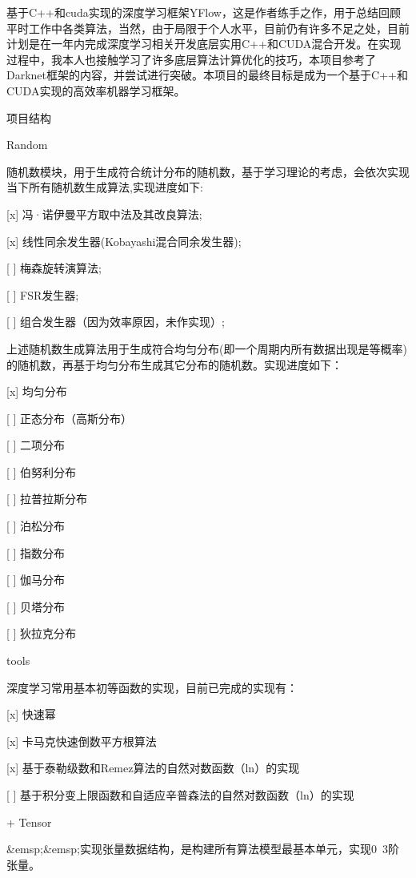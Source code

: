 \quad{}\quad{}基于\+C++和cuda实现的深度学习框架\+YFlow，这是作者练手之作，用于总结回顾平时工作中各类算法，当然，由于局限于个人水平，目前仍有许多不足之处，目前计划是在一年内完成深度学习相关开发底层实用\+C++和\+CUDA混合开发。在实现过程中，我本人也接触学习了许多底层算法计算优化的技巧，本项目参考了\+Darknet框架的内容，并尝试进行突破。本项目的最终目标是成为一个基于\+C++和\+CUDA实现的高效率机器学习框架。


\begin{DoxyItemize}
\item 项目结构
\begin{DoxyItemize}
\item Random

\quad{}\quad{}随机数模块，用于生成符合统计分布的随机数，基于学习理论的考虑，会依次实现当下所有随机数生成算法,实现进度如下\+:
\begin{DoxyItemize}
\item \mbox{[}x\mbox{]} 冯·诺伊曼平方取中法及其改良算法;
\item \mbox{[}x\mbox{]} 线性同余发生器(Kobayashi混合同余发生器);
\item \mbox{[} \mbox{]} 梅森旋转演算法;
\item \mbox{[} \mbox{]} FSR发生器;
\item \mbox{[} \mbox{]} 组合发生器（因为效率原因，未作实现）;
\end{DoxyItemize}

\quad{}\quad{}上述随机数生成算法用于生成符合均匀分布(即一个周期内所有数据出现是等概率)的随机数，再基于均匀分布生成其它分布的随机数。实现进度如下：
\begin{DoxyItemize}
\item \mbox{[}x\mbox{]} 均匀分布
\item \mbox{[} \mbox{]} 正态分布（高斯分布）
\item \mbox{[} \mbox{]} 二项分布
\item \mbox{[} \mbox{]} 伯努利分布
\item \mbox{[} \mbox{]} 拉普拉斯分布
\item \mbox{[} \mbox{]} 泊松分布
\item \mbox{[} \mbox{]} 指数分布
\item \mbox{[} \mbox{]} 伽马分布
\item \mbox{[} \mbox{]} 贝塔分布
\item \mbox{[} \mbox{]} 狄拉克分布
\end{DoxyItemize}
\item tools

\quad{}\quad{}深度学习常用基本初等函数的实现，目前已完成的实现有：
\begin{DoxyItemize}
\item \mbox{[}x\mbox{]} 快速幂
\item \mbox{[}x\mbox{]} 卡马克快速倒数平方根算法
\item \mbox{[}x\mbox{]} 基于泰勒级数和\+Remez算法的自然对数函数（ln）的实现
\item \mbox{[} \mbox{]} 基于积分变上限函数和自适应辛普森法的自然对数函数（ln）的实现
\end{DoxyItemize}
\end{DoxyItemize}
\end{DoxyItemize}

\begin{DoxyVerb}+ Tensor

    &emsp;&emsp;实现张量数据结构，是构建所有算法模型最基本单元，实现0~3阶张量。
\end{DoxyVerb}
 